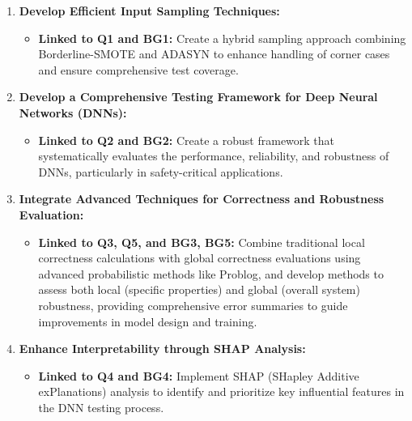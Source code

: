 \begin{enumerate}

  \item \textbf{Develop Efficient Input Sampling Techniques:}
    
  \begin{itemize}
      \item \textbf{Linked to Q1 and BG1:} Create a hybrid sampling approach combining Borderline-SMOTE and ADASYN to enhance handling of corner cases and ensure comprehensive test coverage.
  \end{itemize}

    \item \textbf{Develop a Comprehensive Testing Framework for Deep Neural Networks (DNNs):}
    
    \begin{itemize}
        \item \textbf{Linked to Q2 and BG2:} Create a robust framework that systematically evaluates the performance, reliability, and robustness of DNNs, particularly in safety-critical applications.
    \end{itemize}
    
    \item \textbf{Integrate Advanced Techniques for Correctness and Robustness Evaluation:}
    
    \begin{itemize}
        \item \textbf{Linked to Q3, Q5, and BG3, BG5:} Combine traditional local correctness calculations with global correctness evaluations using advanced probabilistic methods like Problog, and develop methods to assess both local (specific properties) and global (overall system) robustness, providing comprehensive error summaries to guide improvements in model design and training.
    \end{itemize}
    
    \item \textbf{Enhance Interpretability through SHAP Analysis:}
    
    \begin{itemize}
        \item \textbf{Linked to Q4 and BG4:} Implement SHAP (SHapley Additive exPlanations) analysis to identify and prioritize key influential features in the DNN testing process.
    \end{itemize}
    
\end{enumerate}



